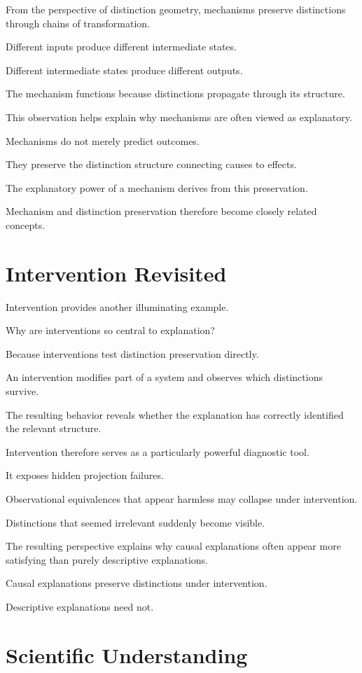 \documentclass[11pt,oneside,openany]{book}
\begin{document}
From the perspective of distinction geometry, mechanisms preserve distinctions through chains of transformation.

Different inputs produce different intermediate states.

Different intermediate states produce different outputs.

The mechanism functions because distinctions propagate through its structure.

This observation helps explain why mechanisms are often viewed as explanatory.

Mechanisms do not merely predict outcomes.

They preserve the distinction structure connecting causes to effects.

The explanatory power of a mechanism derives from this preservation.

Mechanism and distinction preservation therefore become closely related concepts.

\section{Intervention Revisited}

Intervention provides another illuminating example.

Why are interventions so central to explanation?

Because interventions test distinction preservation directly.

An intervention modifies part of a system and observes which distinctions survive.

The resulting behavior reveals whether the explanation has correctly identified the relevant structure.

Intervention therefore serves as a particularly powerful diagnostic tool.

It exposes hidden projection failures.

Observational equivalences that appear harmless may collapse under intervention.

Distinctions that seemed irrelevant suddenly become visible.

The resulting perspective explains why causal explanations often appear more satisfying than purely descriptive explanations.

Causal explanations preserve distinctions under intervention.

Descriptive explanations need not.

\section{Scientific Understanding}
\end{document}
